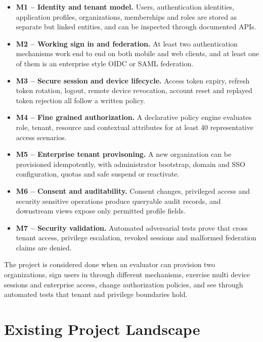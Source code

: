 \documentclass[11pt,a4paper]{article}
\begin{document}
\begin{itemize}[leftmargin=1.5em,itemsep=2pt]
    \item \textbf{M1 -- Identity and tenant model.} Users, authentication identities, application profiles, organizations, memberships and roles are stored as separate but linked entities, and can be inspected through documented APIs.
    \item \textbf{M2 -- Working sign in and federation.} At least two authentication mechanisms work end to end on both mobile and web clients, and at least one of them is an enterprise style OIDC or SAML federation.
    \item \textbf{M3 -- Secure session and device lifecycle.} Access token expiry, refresh token rotation, logout, remote device revocation, account reset and replayed token rejection all follow a written policy.
    \item \textbf{M4 -- Fine grained authorization.} A declarative policy engine evaluates role, tenant, resource and contextual attributes for at least 40 representative access scenarios.
    \item \textbf{M5 -- Enterprise tenant provisoning.} A new organization can be provisioned idempotently, with administrator bootstrap, domain and SSO configuration, quotas and safe suspend or reactivate.
    \item \textbf{M6 -- Consent and auditability.} Consent changes, privileged access and security sensitive operations produce queryable audit records, and downstream views expose only permitted profile fields.
    \item \textbf{M7 -- Security validation.} Automated adversarial tests prove that cross tenant access, privilege escalation, revoked sessions and malformed federation claims are denied.
\end{itemize}

The project is considered done when an evaluator can provision two organizations, sign users in through different mechanisms, exercise multi device sessions and enterprise access, change authorization policies, and see through automated tests that tenant and privilege boundaries hold.

\section{Existing Project Landscape}
\end{document}
